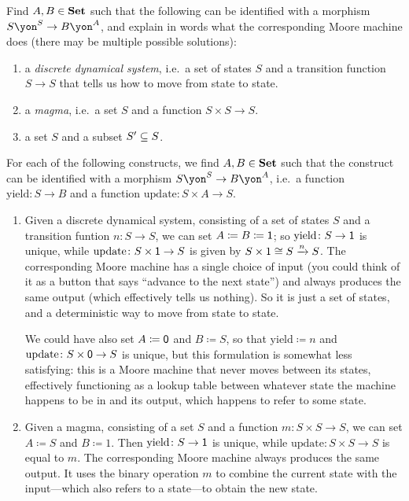 \documentclass[Book-Poly]{subfiles}
\begin{document}
\begin{exercise}
Find $A,B\in\smset$ such that the following can be identified with a morphism $S\yon^S\to B\yon^A$, and explain in words what the corresponding Moore machine does (there may be multiple possible solutions):
\begin{enumerate}
	\item a \emph{discrete dynamical system}, i.e.\ a set of states $S$ and a transition function $S\to S$ that tells us how to move from state to state.
	\item a \emph{magma}, i.e.\ a set $S$ and a function $S\times S\to S$.
	\item a set $S$ and a subset $S'\ss S$.\qedhere
\end{enumerate}
\begin{solution}
For each of the following constructs, we find $A, B \in \smset$ such that the construct can be identified with a morphism $S\yon^S \to B\yon^A$, i.e.\ a function $\text{yield} \colon S \to B$ and a function $\text{update} \colon S \times A \to S$.
\begin{enumerate}
    \item Given a discrete dynamical system, consisting of a set of states $S$ and a transition funtion $n \colon S \to S$, we can set $A \coloneqq B \coloneqq \1$; so $\text{yield} \colon S \to \1$ is unique, while $\text{update} \colon S \times \1 \to S$ is given by $S \times 1 \iso S \To{n} S$.
    The corresponding Moore machine has a single choice of input (you could think of it as a button that says ``advance to the next state'') and always produces the same output (which effectively tells us nothing).
    So it is just a set of states, and a deterministic way to move from state to state.
    
    We could have also set $A \coloneqq \0$ and $B \coloneqq S$, so that $\text{yield} \coloneqq n$ and $\text{update} \colon S \times \0 \to S$ is unique, but this formulation is somewhat less satisfying: this is a Moore machine that never moves between its states, effectively functioning as a lookup table between whatever state the machine happens to be in and its output, which happens to refer to some state.
    
    \item Given a magma, consisting of a set $S$ and a function $m \colon S \times S \to S$, we can set $A \coloneqq S$ and $B \coloneqq 1$.
    Then $\text{yield} \colon S \to \1$ is unique, while $\text{update} \colon S \times S \to S$ is equal to $m$.
    The corresponding Moore machine always produces the same output.
    It uses the binary operation $m$ to combine the current state with the input---which also refers to a state---to obtain the new state.
    

\end{enumerate}
\end{solution}
\end{exercise}
\end{document}
